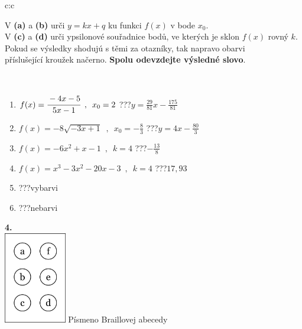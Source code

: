 \documentclass[10pt]{report}
\begin{document}
\begin{tabular}{c:c}
\begin{minipage}[c][104.5mm][t]{0.5\linewidth}
\begin{center}
\begin{minipage}{0.95\linewidth}
\begin{center}
V \textbf{(a)} a \textbf{(b)} urči  $y = kx + q$ ku funkci $f(x)$ v bode $x_0$.\\V \textbf{(c)} a \textbf{(d)} urči ypsilonové souřadnice bodů, ve kterých je sklon $f(x)$ rovný $k$.\\Pokud se výsledky shodujú s těmi za otazníky, tak napravo obarvi\\příslušející kroužek načerno. \textbf{Spolu odevzdejte výsledné slovo}.
\end{center}
\end{minipage}
\\[1mm]
\begin{minipage}{0.79\linewidth}
\begin{center}
\begin{varwidth}{\linewidth}
\begin{enumerate}
\small
\item $f(x)=\cfrac{-4x-5}{5x-1}\enspace , \enspace x_0=2$\quad \dotfill\; ???\;\dotfill \quad $y = \frac{29}{81}x-\frac{175}{81}$
\item $f(x)=-8\sqrt{-3x+1}\enspace , \enspace x_0=-\frac{8}{3}$\quad \dotfill\; ???\;\dotfill \quad $y = 4x-\frac{80}{3}$
\item $f(x)=-6x^2+x-1\enspace , \enspace k=4$\quad \dotfill\; ???\;\dotfill \quad $-\frac{13}{8}$
\item $f(x)=x^3-3x^2-20x-3\enspace , \enspace k=4$\quad \dotfill\; ???\;\dotfill \quad $17 , 93$
\item \quad \dotfill\; ???\;\dotfill \quad vybarvi
\item \quad \dotfill\; ???\;\dotfill \quad nebarvi
\end{enumerate}
\end{varwidth}
\end{center}
\end{minipage}
\begin{minipage}{0.20\linewidth}
\begin{center}
{\Huge\bfseries 4.} \\[2mm]
\includegraphics[height=40mm]{../images/braille.png}
{\small Písmeno Braillovej abecedy}
\end{center}
\end{minipage}
\end{center}
\end{minipage}
%
\end{tabular}
\end{document}
